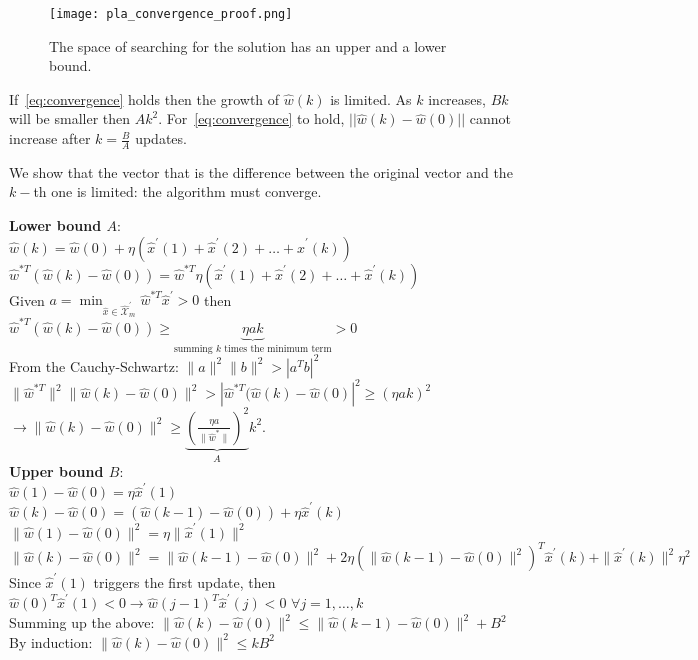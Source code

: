 \documentclass[main]{subfiles}
\begin{document}
\begin{figure}[H]
	\centering
	\texttt{[image: pla\_convergence\_proof.png]}
	\caption{The space of searching for the solution has an upper and a lower bound.}
	\label{fig:simplified-LT}
\end{figure}
If~\ref{eq:convergence} holds then the growth of $\hat{w}(k)$ is limited.
As $k$ increases, $Bk$ will be smaller then $Ak^2$.
For~\ref{eq:convergence} to hold, $|| \hat{w}(k) - \hat{w}(0) ||$ cannot increase after $k = \frac{B}{A}$ updates.

We show that the vector that is the difference between the original vector and the $k-$th one is limited: the algorithm must converge.

\textbf{Lower bound $A$}:\\
\indent \indent $\hat{w}(k) = \hat{w}(0) + \eta (\hat{x}^{\prime}(1) + \hat{x}^{\prime}(2) + \dots + \hat{x}^{\prime}(k))$\\
\indent \indent $\hat{w}^{*T} (\hat{w}(k) - \hat{w}(0)) = \hat{w}^{*T} \eta (\hat{x}^{\prime}(1) + \hat{x}^{\prime}(2) + \dots + \hat{x}^{\prime}(k))$ \\
\indent \indent Given $a = \min_{\hat{x} \in \hat{\mathcal{X}}^{\prime}_{m}} \hat{w}^{*T} \hat{x}^{\prime} > 0$ then $\hat{w}^{*T}(\hat{w}(k) - \hat{w}(0)) \geq \underbrace{\eta a k}_{\text{summing $k$ times the minimum term}} > 0$\\
\indent \indent From the Cauchy-Schwartz: $\| a \|^2 \| b \| ^2 > |a^T b |^2$\\
\indent \indent $\|\hat{w}^{*T}\|^2 \|\hat{w}(k) - \hat{w}(0) \|^2 > | \hat{w}^{*T} (\hat{w}(k) - \hat{w}(0)|^2 \geq (\eta a k )^2$ \\
\indent \indent $\rightarrow \| \hat{w}(k) - \hat{w}(0)\|^2 \geq \underbrace{\left( \frac{\eta a}{\| \hat{w}^* \|} \right)^2}_{A} k^2$.\\

\textbf{Upper bound $B$}:\\
\indent \indent $\hat{w}(1) - \hat{w}(0) = \eta \hat{x}^{\prime}(1)$\\
\indent \indent $\hat{w}(k) - \hat{w}(0) = (\hat{w}(k-1) - \hat{w}(0)) + \eta \hat{x}^{\prime}(k)$\\
\indent \indent $\| \hat{w}(1) - \hat{w}(0) \| ^2 = \eta \|\hat{x}^{\prime}(1) \|^2$\\
\indent \indent $\| \hat{w}(k) - \hat{w}(0) \|^2 = \| \hat{w}(k-1) - \hat{w}(0)\|^2 + 2 \eta (\| \hat{w}(k-1) - \hat{w}(0)\|^2)^T \hat{x}^{\prime}(k) + \|\hat{x}^{\prime}(k)\|^2 \eta^2$\\
\indent \indent Since $\hat{x}^{\prime}(1)$ triggers the first update, then $\hat{w}(0)^{T} \hat{x}^{\prime}(1) <0 \rightarrow \hat{w}(j-1)^T \hat{x}^{\prime}(j) < 0$ $\forall j = 1, \dots, k$\\
\indent \indent Summing up the above: $\| \hat{w}(k) - \hat{w}(0) \|^2 \leq \| \hat{w}(k-1) - \hat{w}(0)\|^2 + B^2$\\
\indent \indent By induction: $\| \hat{w}(k) - \hat{w}(0) \|^2 \leq k B^2$\\
\end{document}
